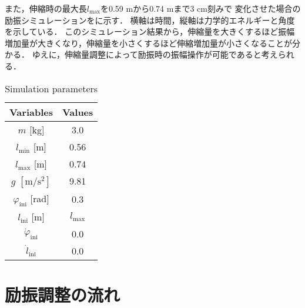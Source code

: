           また，伸縮時の最大長$l_{\mathrm{max}}$を0.59 mから0.74 mまで3 cm刻みで
          変化させた場合の励振シミュレーションをに示す．
          横軸は時間，縦軸は力学的エネルギーと角度を示している．
          このシミュレーション結果から，伸縮量を大きくするほど振幅増加量が大きくなり，伸縮量を小さくするほど伸縮増加量が小さくなることが分かる．
          ゆえに，伸縮量調整によって励振時の振幅操作が可能であると考えられる．
          \begin{table}[tb]
            \begin{center}
              \caption{Simulation parameters}
              \vspace{2mm}
              \begin{tabular}{c|c}
                \hline
                Variables & Values \\
                \hline
                $m$ [kg] & 3.0 \\
                $l_{\mathrm{min}}$ [m] & 0.56 \\
                $l_{\mathrm{max}}$ [m] & 0.74 \\
                $g$ $\mathrm{[m/s^2]}$ & 9.81 \\
                $\varphi_{\mathrm{ini}}$ [rad] & 0.3 \\
                $l_{\mathrm{ini}}$ [m]& $l_{\mathrm{max}}$ \\
                $\dot{\varphi}_{\mathrm{ini}}$ & 0.0 \\
                $\dot{l}_{\mathrm{ini}}$ & 0.0 \\
                \hline
              \end{tabular}
            \end{center}
          \end{table}
        
          
        \newpage
        \section{励振調整の流れ}


